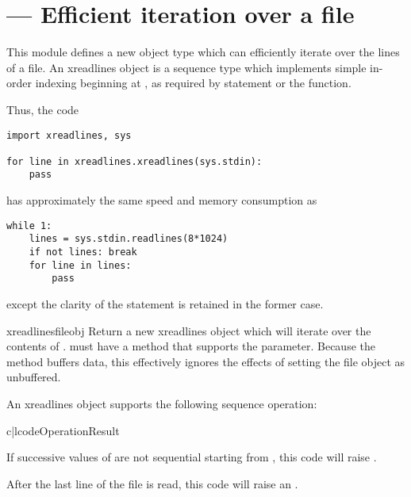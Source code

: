 \section{ ---
         Efficient iteration over a file}




This module defines a new object type which can efficiently iterate
over the lines of a file.  An xreadlines object is a sequence type
which implements simple in-order indexing beginning at , as
required by  statement or the
 function.

Thus, the code

\begin{verbatim}
import xreadlines, sys

for line in xreadlines.xreadlines(sys.stdin):
    pass
\end{verbatim}

has approximately the same speed and memory consumption as

\begin{verbatim}
while 1:
    lines = sys.stdin.readlines(8*1024)
    if not lines: break
    for line in lines:
        pass
\end{verbatim}

except the clarity of the  statement is retained in the
former case.

\begin{funcdesc}{xreadlines}{fileobj}
  Return a new xreadlines object which will iterate over the contents
  of .   must have a 
  method that supports the  parameter.  
  Because the  method buffers data, this
  effectively ignores the effects of setting the file object as
  unbuffered.
\end{funcdesc}

An xreadlines object  supports the following sequence
operation:

\begin{tableii}{c|l}{code}{Operation}{Result}
\end{tableii}

If successive values of  are not sequential starting from
, this code will raise .

After the last line of the file is read, this code will raise an
.
